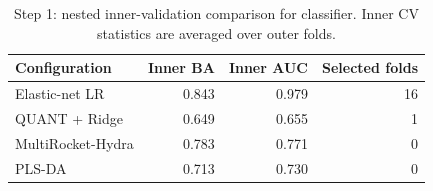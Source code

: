 \begin{table}[t]
\centering
\caption{Step 1: nested inner-validation comparison for classifier. Inner CV statistics are averaged over outer folds.}
\label{tab:step1_candidates}
\small
\begin{tabular}{lrrr}
\toprule
Configuration & Inner BA & Inner AUC & Selected folds \\
\midrule
Elastic-net LR & 0.843 & 0.979 & 16 \\
QUANT + Ridge & 0.649 & 0.655 & 1 \\
MultiRocket-Hydra & 0.783 & 0.771 & 0 \\
PLS-DA & 0.713 & 0.730 & 0 \\
\bottomrule
\end{tabular}
\end{table}

